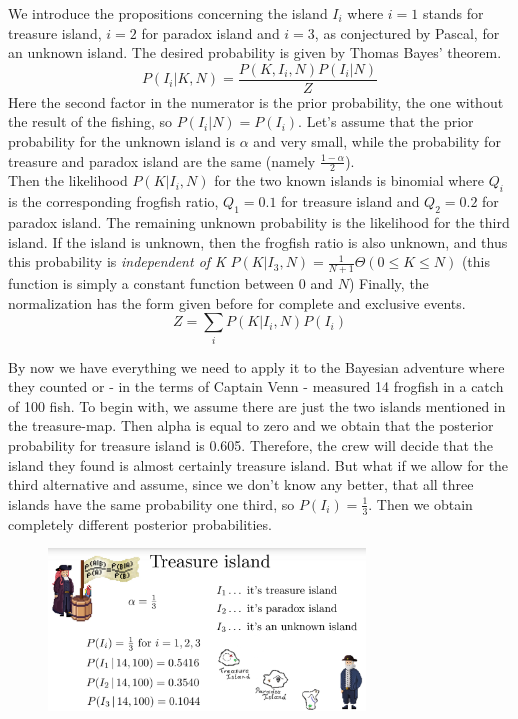\documentclass[12pt, a4paper]{scrartcl}
\begin{document}
We introduce the propositions concerning the island $I_i$ where $i= 1$ stands for
treasure island, $i=2$ for paradox island and $i=3$, as conjectured by Pascal,
for an unknown island. The desired probability is given by Thomas Bayes’
theorem. \[P(I_i|K,N)=\frac{P(K,I_i,N)P(I_i|N)}{Z}\]
Here the second factor in the numerator is the prior probability, the one without the result of the fishing, so $P(I_i|N)=P(I_i)$.
Let’s assume that the prior probability for the unknown island is $\alpha$ and very
small, while the probability for treasure and paradox island are the same (namely $\frac{1-\alpha}{2}$).\\%

Then the likelihood $P(K|I_i,N)$ for the two known islands is binomial
where $Q_i$ is the corresponding frogfish ratio,
$Q_1 = 0.1$ for treasure island and $Q_2 = 0.2$ for paradox island.
The remaining unknown probability is the likelihood for the third island.
If the island is unknown, then the frogfish ratio is also unknown, and thus
this probability is \textit{independent of K} $P(K|I_3,N)=\frac{1}{N+1}\Theta(0\leq K\leq N)$ (this function is simply a constant function between 0 and $N$)
Finally, the normalization has the form given before for complete and exclusive events.\[Z=\sum_iP(K|I_i,N)P(I_i)\]

By now we have everything we need to apply it to the Bayesian adventure
where they counted or - in the terms of Captain Venn - measured 14 frogfish
in a catch of 100 fish.
To begin with, we assume there are just the two islands mentioned in the
treasure-map. Then alpha is equal to zero and we obtain that the posterior probability for
treasure island is 0.605. Therefore, the crew will decide that the island 
they found is almost certainly treasure island.
But what if we allow for the third alternative and assume, since we don’t
know any better, that all three islands have the same probability one third, so $P(I_i)=\frac 13$.
Then we obtain completely different posterior probabilities.\\%
 \begin{figure}[H]
	\centering
	\includegraphics[width=0.75\textwidth]{6_2.png}
\end{figure}
\end{document}
